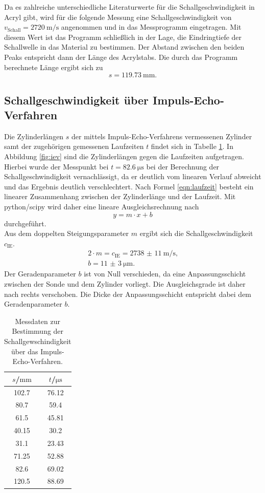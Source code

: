 Da es zahlreiche unterschiedliche Literaturwerte für die Schallgeschwindigkeit in Acryl gibt, wird für die folgende Messung eine Schallgeschwindigkeit von $v_{\mathrm{Schall}}=\SI{2720}{\meter\per\second}$ angenommen und in das Messprogramm eingetragen.
Mit diesem Wert ist das Programm schließlich in der Lage, die Eindringtiefe der Schallwelle in das Material zu bestimmen.
Der Abstand zwischen den beiden Peaks entspricht dann der Länge des Acrylstabs.
Die durch das Programm berechnete Länge ergibt sich zu
\begin{equation}
  s=\SI{119.73}{\milli\meter} \text{.}
\end{equation}
\FloatBarrier

\subsection{Schallgeschwindigkeit über Impuls-Echo-Verfahren}
Die Zylinderlängen $s$ der mittels Impuls-Echo-Verfahrens vermessenen Zylinder samt der zugehörigen gemessenen Laufzeiten $t$ findet sich in Tabelle \ref{tab:iev}. In Abbildung \ref{fig:iev} sind die Zylinderlängen gegen die Laufzeiten aufgetragen.
Hierbei wurde der Messpunkt bei $t=\SI{82.6}{\micro\second}$ bei der Berechnung der Schallgeschwindigkeit vernachlässigt, da er deutlich vom linearen Verlauf abweicht und das Ergebnis deutlich verschlechtert.
Nach Formel \eqref{eqn:laufzeit} besteht ein linearer Zusammenhang zwischen der Zylinderlänge und der Laufzeit.
Mit python/scipy \cite{scipy} wird daher eine lineare Ausgleichsrechnung nach
\begin{equation}
  y=m\cdot x +b
\end{equation}
durchgeführt.\\
Aus dem doppelten Steigungsparameter $m$ ergibt sich die Schallgeschwindigkeit $c_\mathrm{IE}$.
\begin{gather*}
2 \cdot m=c_\mathrm{IE}=  \SI{2738(11)}{\meter\per\second} \text{,}\\
b=  \SI{11(3)}{\micro\meter} \text{.}
\end{gather*}
Der Geradenparameter $b$ ist von Null verschieden, da eine Anpassungsschicht zwischen der Sonde und dem Zylinder vorliegt. Die Ausgleichsgrade ist daher nach rechts verschoben. Die Dicke der Anpassungsschicht entspricht dabei dem Geradenparameter $b$.
\begin{table}
  \centering
  \caption{Messdaten zur Bestimmung der Schallgewschindigkeit über das Impuls-Echo-Verfahren.}
  \label{tab:iev}
  \begin{tabular}{cc}
    \toprule
    $s$/$\si{\milli\meter}$ & $t$/$\si{\micro\second}$ \\
    \midrule
    102.7 & 76.12 \\
    80.7 & 59.4 \\
    61.5 & 45.81 \\
    40.15 & 30.2 \\
    31.1 & 23.43 \\
    71.25 & 52.88 \\
    82.6 & 69.02 \\
    120.5 & 88.69 \\
    \bottomrule
  \end{tabular}
\end{table}


